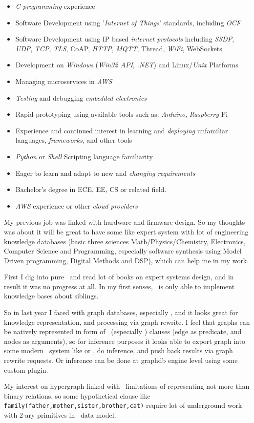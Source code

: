 \begin{framed}\noindent
\begin{itemize}[nosep,leftmargin=*]
\item \emph{C programming} experience
\item Software Development using '\emph{Internet of Things}' standards, including \emph{OCF}
\item Software Development using IP based \emph{internet protocols} including \emph{SSDP}, \emph{UDP}, \emph{TCP}, \emph{TLS}, CoAP, \emph{HTTP}, \emph{MQTT}, Thread, \emph{WiFi}, WebSockets
\item Development on \emph{Windows} (\emph{Win32 API}, \emph{.NET}) and Linux/\emph{Unix} Platforms
\item Managing microservices in \emph{AWS}
\item \emph{Testing} and debugging \emph{embedded electronics}
\item Rapid prototyping using available tools such as: \emph{Arduino}, \emph{Raspberry} Pi
\item Experience and continued interest in learning and \emph{deploying} unfamiliar languages, \emph{frameworks}, and other tools
\item \emph{Python} or \emph{Shell} Scripting language familiarity
\item Eager to learn and adapt to new and \emph{changing requirements}
\item Bachelor's degree in ECE, EE, CS or related field.
\item \emph{AWS} experience or other \emph{cloud providers}
\end{itemize}
\end{framed}

My previous job was linked with hardware and firmware design. So my thoughts was
about it will be great to have some  like expert system with
lot of engineering knowledge databases (basic three sciences
Math/Physics/Chemistry, Electronics, Computer Science and Programming,
especially software synthesis using Model Driven programming, Digital Methods
and DSP), which can help me in my work.

First I dig into pure \prolog\ and read lot of books on expert systems design,
and in result it was no progress at all. In my first senses, \prolog\ is only
able to implement knowledge bases about siblings.

So in last year I faced with graph databases, especially \neo, and it looks
great for knowledge representation, and processing via graph rewrite. I feel
that graphs can be natively represented in form of \prolog\ (especially
) clauses (edge as
predicate, and nodes as arguments), so for inference purposes it looks able to
export graph into some modern \prolog\ system like
 or \xsb, do inference,
and push back results via graph rewrite requests. Or inference can be done at
graphdb engine level using some custom plugin.

My interest on hypergraph linked with \neo\ limitations of representing not
more than binary relations, so some hypothetical clause like
\verb|family(father,mother,sister,brother,cat)| require lot of underground work
with 2-ary primitives in \neo\ data model.

